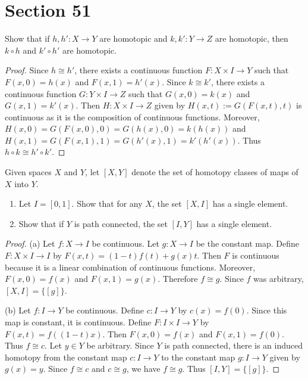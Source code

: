 \documentclass[10pt,oneside,openany]{memoir}
\begin{document}
\section*{Section 51}
\begin{exercise}[manual-num={1}]
Show that if $h,h': X \rightarrow Y$ are homotopic and $k,k': Y \rightarrow Z$ are homotopic, then $k \circ h$ and $k' \circ h'$ are homotopic.
\end{exercise}
    \begin{proof}
        Since $h \cong h'$, there exists a continuous function $F:X \times I \rightarrow Y$ such that $F(x,0) = h(x)$ and $F(x,1) = h'(x)$. Since $k \cong k'$, there exists a continuous function $G:Y \times I \rightarrow Z$ such that $G(x,0) = k(x)$ and $G(x,1) = k'(x)$. Then $H:X \times I \rightarrow Z$ given by $H(x,t) := G(F(x,t),t)$ is continuous as it is the composition of continuous functions. Moreover, $H(x,0) = G(F(x,0),0) = G(h(x),0) = k(h(x))$ and $H(x,1) = G(F(x,1),1) = G(h'(x),1) = k'(h'(x))$.  Thus $h \circ k \cong h' \circ k'$.
    \end{proof}

\begin{exercise}[manual-num={2}]
Given spaces $X$ and $Y$, let $[X,Y]$ denote the set of homotopy classes of maps of $X$ into $Y$.
\begin{enumerate}[label = (\alph*),itemsep=1pt,topsep=3pt]
    \item Let $I = [0,1]$. Show that for any $X$, the set $[X,I]$ has a single element.
    \item Show that if $Y$ is path connected, the set $[I,Y]$ has a single element.
\end{enumerate}
\end{exercise}
    \begin{proof}
        (a) Let $f:X \rightarrow I$ be continuous. Let $g:X \rightarrow I$ be the constant map. Define $F:X \times I \rightarrow I$ by $F(x,t) = (1-t)f(t) + g(x)t$. Then $F$ is continuous because it is a linear combination of continuous functions. Moreover, $F(x,0) = f(x)$ and $F(x,1) = g(x)$. Therefore $f \cong g$. Since $f$ was arbitrary, $[X,I] = \{[g]\}$.

        (b) Let $f:I \rightarrow Y$ be continuous. Define $c:I \rightarrow Y$ by $c(x) = f(0)$. Since this map is constant, it is continuous. Define $F:I \times I \rightarrow Y$ by $F(x,t) = f((1-t)x)$. Then $F(x,0) = f(x)$ and $F(x,1) = f(0)$. Thus $f \cong c$.  Let $y \in Y$ be arbitrary. Since $Y$ is path connected, there is an induced homotopy from the constant map $c:I \rightarrow Y$ to the constant map $g:I \rightarrow Y$ given by $g(x) = y$. Since $f \cong c$ and $c \cong g$, we have $f \cong g$. Thus $[I,Y] = \{[g]\}$.
    \end{proof}
\end{document}
